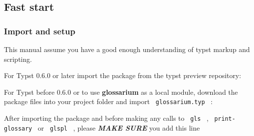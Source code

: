 \subsection{Fast start}\label{fast-start}

\begin{Shaded}
\begin{Highlighting}[]
\NormalTok{  (}
\NormalTok{  ),}
\NormalTok{)}
\NormalTok{)}
\end{Highlighting}
\end{Shaded}

\subsubsection{Import and setup}\label{import-and-setup}

This manual assume you have a good enough understanding of typst markup
and scripting.

For Typst 0.6.0 or later import the package from the typst preview
repository:

\begin{Shaded}
\begin{Highlighting}[]
\end{Highlighting}
\end{Shaded}

For Typst before 0.6.0 or to use \textbf{glossarium} as a local module,
download the package files into your project folder and import
\texttt{\ glossarium.typ\ } :

\begin{Shaded}
\begin{Highlighting}[]
\end{Highlighting}
\end{Shaded}

After importing the package and before making any calls to
\texttt{\ gls\ } , \texttt{\ print-glossary\ } or \texttt{\ glspl\ } ,
please \emph{\textbf{MAKE SURE}} you add this line

